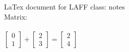 \documentclass[11pt]{article}
\begin{document}
LaTex document for LAFF class: notes\\
Matrix:
\\
\\
$\begin{bmatrix}
{0} \\
{1}
\end{bmatrix}
+
\begin{bmatrix}
{2}\\
{3}
\end{bmatrix}
=
\begin{bmatrix}
{2}\\
{4}
\end{bmatrix}
$
\end{document}
